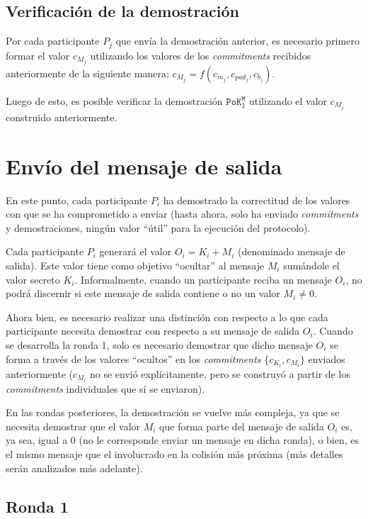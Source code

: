 \subsection{Verificación de la demostración}

Por cada participante $P_j$ que envía la demostración anterior, es necesario primero 
formar el valor $c_{M_j}$ utilizando los valores de los \emph{commitments} recibidos 
anteriormente de la siguiente manera: $c_{M_j} = f(c_{m_j}, c_{pad_j}, c_{b_j})$.

Luego de esto, es posible verificar la demostración $\mathtt{PoK_j^M}$ utilizando el 
valor $c_{M_j}$ construido anteriormente.

\section{Envío del mensaje de salida}

En este punto, cada participante $P_i$ ha demostrado la correctitud de los valores 
con que se ha comprometido a enviar (hasta ahora, solo ha enviado \emph{commitments} 
y demostraciones, ningún valor ``útil'' para la ejecución del protocolo).

Cada participante $P_i$ generará el valor $O_i = K_i + M_i$ (denominado mensaje de salida). 
Este valor tiene como objetivo ``ocultar'' al mensaje $M_i$ sumándole el valor 
secreto $K_i$. Informalmente, cuando un participante reciba un mensaje $O_i$, no podrá 
discernir si este mensaje de salida contiene o no un valor $M_i \neq 0$.

Ahora bien, es necesario realizar una distinción con respecto a lo que cada participante 
necesita demostrar con respecto a su mensaje de salida $O_i$. Cuando se desarrolla la 
ronda 1, solo es necesario demostrar que dicho mensaje $O_i$ se forma a través de los 
valores ``ocultos'' en los \emph{commitments} $\{c_{K_i}, c_{M_i}\}$ enviados anteriormente 
($c_{M_i}$ no se envió explícitamente, pero se construyó a partir de los \emph{commitments} 
individuales que sí se enviaron).

En las rondas posteriores, la demostración se vuelve más compleja, ya que se necesita 
demostrar que el valor $M_i$ que forma parte del mensaje de salida $O_i$ es, ya sea, igual 
a 0 (no le corresponde enviar un mensaje en dicha ronda), o bien, es el mismo mensaje que 
el involucrado en la colisión más próxima (más detalles serán analizados más adelante).

\subsection{Ronda 1}

